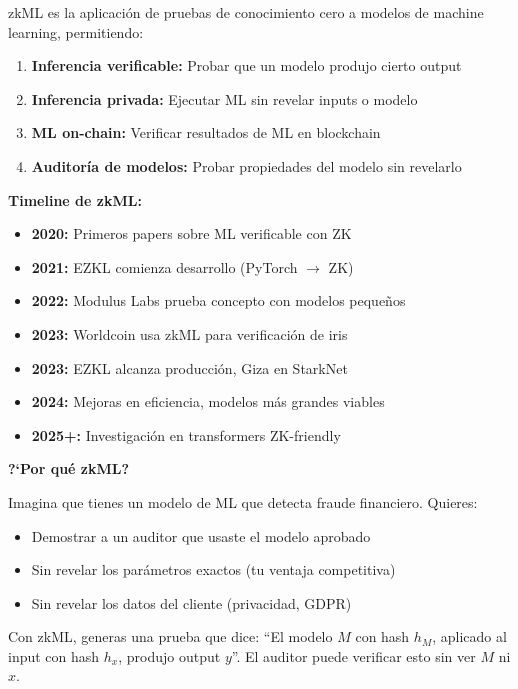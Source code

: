 \documentclass[11pt,a4paper,twoside]{book}
\begin{document}
\begin{definition}
zkML es la aplicaci\'on de pruebas de conocimiento cero a modelos de machine learning, permitiendo:
\begin{enumerate}
    \item \textbf{Inferencia verificable:} Probar que un modelo produjo cierto output
    \item \textbf{Inferencia privada:} Ejecutar ML sin revelar inputs o modelo
    \item \textbf{ML on-chain:} Verificar resultados de ML en blockchain
    \item \textbf{Auditor\'ia de modelos:} Probar propiedades del modelo sin revelarlo
\end{enumerate}
\end{definition}

\begin{mathnote}
\textbf{Timeline de zkML:}
\begin{itemize}
    \item \textbf{2020:} Primeros papers sobre ML verificable con ZK
    \item \textbf{2021:} EZKL comienza desarrollo (PyTorch $\to$ ZK)
    \item \textbf{2022:} Modulus Labs prueba concepto con modelos peque\~nos
    \item \textbf{2023:} Worldcoin usa zkML para verificaci\'on de iris
    \item \textbf{2023:} EZKL alcanza producci\'on, Giza en StarkNet
    \item \textbf{2024:} Mejoras en eficiencia, modelos m\'as grandes viables
    \item \textbf{2025+:} Investigaci\'on en transformers ZK-friendly
\end{itemize}
\end{mathnote}

\begin{intuicion}
\textbf{?`Por qu\'e zkML?}

Imagina que tienes un modelo de ML que detecta fraude financiero. Quieres:
\begin{itemize}
    \item Demostrar a un auditor que usaste el modelo aprobado
    \item Sin revelar los par\'ametros exactos (tu ventaja competitiva)
    \item Sin revelar los datos del cliente (privacidad, GDPR)
\end{itemize}

Con zkML, generas una prueba que dice: ``El modelo $M$ con hash $h_M$, aplicado al input con hash $h_x$, produjo output $y$''. El auditor puede verificar esto sin ver $M$ ni $x$.
\end{intuicion}
\end{document}
